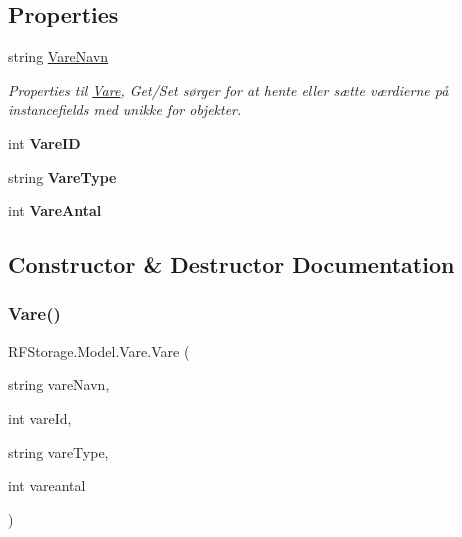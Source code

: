 \subsection*{Properties}
\begin{DoxyCompactItemize}
\item 
string \mbox{\hyperlink{class_r_f_storage_1_1_model_1_1_vare_accda6c4cf6643b8fc463fffcc59b2c21}{Vare\+Navn}}
\begin{DoxyCompactList}\small\item\em Properties til \mbox{\hyperlink{class_r_f_storage_1_1_model_1_1_vare}{Vare}}, Get/\+Set sørger for at hente eller sætte værdierne på instancefields med unikke for objekter. \end{DoxyCompactList}\item 
\mbox{\label{class_r_f_storage_1_1_model_1_1_vare_a0c4e07dd5f61fedaa53b5fb5842b96f3}} 
int {\bfseries Vare\+ID}
\item 
\mbox{\label{class_r_f_storage_1_1_model_1_1_vare_a967ac23f42bb20528abb536d0e054cb7}} 
string {\bfseries Vare\+Type}
\item 
\mbox{\label{class_r_f_storage_1_1_model_1_1_vare_ae85f6c8e243e376e1c75eb22d913a215}} 
int {\bfseries Vare\+Antal}
\end{DoxyCompactItemize}


\subsection{Constructor \& Destructor Documentation}
\mbox{\label{class_r_f_storage_1_1_model_1_1_vare_ae105d8d34d634a8f033810cd548f46c7}} 
\subsubsection{\texorpdfstring{Vare()}{Vare()}}
{\footnotesize\ttfamily R\+F\+Storage.\+Model.\+Vare.\+Vare (\begin{DoxyParamCaption}\item[{string}]{vare\+Navn,  }\item[{int}]{vare\+Id,  }\item[{string}]{vare\+Type,  }\item[{int}]{vareantal }\end{DoxyParamCaption})}



